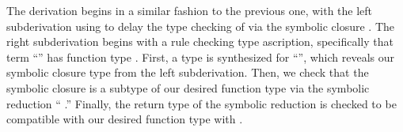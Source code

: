 The derivation begins in a similar fashion to the previous one, 
with the left subderivation using \ltiSimpUAbs
to delay the type checking of {\colorbox{pink}{\ltiufun{\ltivar{}}{\ltiF{}}}}
via the symbolic closure
\colorbox{pink}
{\ltiClosure{{\ltiEnv{}}}
           {\ltiufun{{\ltivar{}}}
                    {\ltiF{}}}}.
The right subderivation
begins with a rule checking type ascription, specifically that  term
``{}''
has function type
{\colorbox{pink}{\ltiPolyFn{\ltiT{}}
                           {\ova{\ltitvar{}}}
                           {\ltiS{}}}}.
First, a type is synthesized for ``{}'',
which reveals our symbolic closure type from the left subderivation.
Then, we check that the symbolic closure is a subtype of 
our desired function type via the symbolic reduction
    ``\ltitSstkjudgementNoElabCombined{\ltiClosureCache{}}
                      {
                                    {\ltiEnvConcat
                                      {{\colorbox{pink}{\ova{\ltitvar{}}}}}
                                      {
                                                    {{\colorbox{pink}{\ltiT{}}}}}}}
                      {\colorbox{pink}{\ltiF{}}}
                      {{\ltiSp{}}}
                      {\ltiClosureCache{}}
                      {}.''
Finally, the return type of the symbolic reduction is checked to be compatible
with our desired function type with
                {\ltiEnv{}}{{\ltiSp{}}}
                           {\colorbox{pink}{\ltiS{}}}
                {}.


